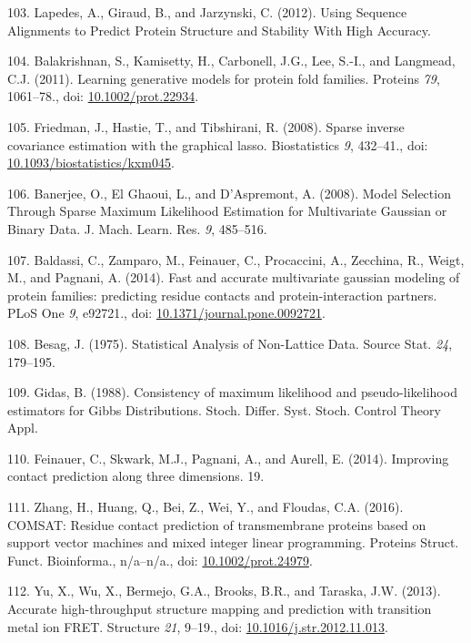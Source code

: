 \documentclass[11pt,a4paper,twoside]{book}
\theoremstyle{definition}
\theoremstyle{definition}
\theoremstyle{remark}
\begin{document}
\hypertarget{ref-Lapedes2012a}{}
103. Lapedes, A., Giraud, B., and Jarzynski, C. (2012). Using Sequence
Alignments to Predict Protein Structure and Stability With High
Accuracy.

\hypertarget{ref-Balakrishnan2011}{}
104. Balakrishnan, S., Kamisetty, H., Carbonell, J.G., Lee, S.-I., and
Langmead, C.J. (2011). Learning generative models for protein fold
families. Proteins \emph{79}, 1061--78., doi:
\href{https://doi.org/10.1002/prot.22934}{10.1002/prot.22934}.

\hypertarget{ref-Friedman2008}{}
105. Friedman, J., Hastie, T., and Tibshirani, R. (2008). Sparse inverse
covariance estimation with the graphical lasso. Biostatistics \emph{9},
432--41., doi:
\href{https://doi.org/10.1093/biostatistics/kxm045}{10.1093/biostatistics/kxm045}.

\hypertarget{ref-Banerjee2008}{}
106. Banerjee, O., El Ghaoui, L., and D'Aspremont, A. (2008). Model
Selection Through Sparse Maximum Likelihood Estimation for Multivariate
Gaussian or Binary Data. J. Mach. Learn. Res. \emph{9}, 485--516.

\hypertarget{ref-Baldassi2014}{}
107. Baldassi, C., Zamparo, M., Feinauer, C., Procaccini, A., Zecchina,
R., Weigt, M., and Pagnani, A. (2014). Fast and accurate multivariate
gaussian modeling of protein families: predicting residue contacts and
protein-interaction partners. PLoS One \emph{9}, e92721., doi:
\href{https://doi.org/10.1371/journal.pone.0092721}{10.1371/journal.pone.0092721}.

\hypertarget{ref-Besag1975}{}
108. Besag, J. (1975). Statistical Analysis of Non-Lattice Data. Source
Stat. \emph{24}, 179--195.

\hypertarget{ref-Gidas1988}{}
109. Gidas, B. (1988). Consistency of maximum likelihood and
pseudo-likelihood estimators for Gibbs Distributions. Stoch. Differ.
Syst. Stoch. Control Theory Appl.

\hypertarget{ref-Feinauer2014}{}
110. Feinauer, C., Skwark, M.J., Pagnani, A., and Aurell, E. (2014).
Improving contact prediction along three dimensions. 19.

\hypertarget{ref-Zhang2016}{}
111. Zhang, H., Huang, Q., Bei, Z., Wei, Y., and Floudas, C.A. (2016).
COMSAT: Residue contact prediction of transmembrane proteins based on
support vector machines and mixed integer linear programming. Proteins
Struct. Funct. Bioinforma., n/a--n/a., doi:
\href{https://doi.org/10.1002/prot.24979}{10.1002/prot.24979}.

\hypertarget{ref-Yu2013}{}
112. Yu, X., Wu, X., Bermejo, G.A., Brooks, B.R., and Taraska, J.W.
(2013). Accurate high-throughput structure mapping and prediction with
transition metal ion FRET. Structure \emph{21}, 9--19., doi:
\href{https://doi.org/10.1016/j.str.2012.11.013}{10.1016/j.str.2012.11.013}.
\end{document}

